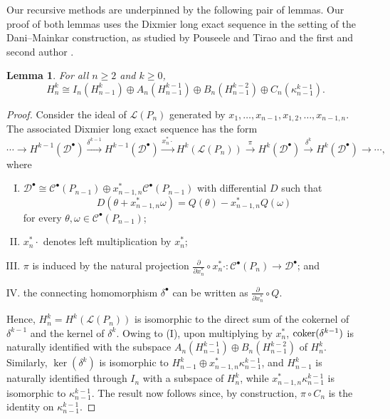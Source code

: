 \documentclass[12pt]{amsart}
\newtheorem{lem}[theorem]{Lemma}
\theoremstyle{definition}
\begin{document}
Our recursive methods are underpinned by the following pair of lemmas. Our proof of both lemmas uses the Dixmier long exact sequence in the setting of the Dani--Mainkar construction, as studied by Pouseele and Tirao \cite{PouseeleTirao09} and the first and second author \cite{AldiBevins24}.

\begin{lem}\label{lem:10} For all $n\ge 2$ and $k\ge 0$,
\begin{equation}
H_n^k\cong I_n(H^k_{n-1})\oplus A_n(H_{n-1}^{k-1})\oplus B_n(H_{n-1}^{k-2})\oplus C_n(\kappa_{n-1}^{k-1}). 
\end{equation}
\end{lem}

\begin{proof}
Consider the ideal of $\mathcal L(P_n)$ generated by 
$x_1,\ldots,x_{n-1},x_{1,2},\ldots,x_{n-1,n}$. The associated Dixmier long exact sequence has the form 
\begin{equation}\label{eq:8bis}
\cdots\rightarrow H^{k-1}(\mathcal D^\bullet)\xrightarrow{\delta^{k-1}}H^{k-1}(\mathcal D^\bullet)\xrightarrow{x_n^*\cdot}H^k(\mathcal L(P_n))\xrightarrow{\pi} H^k(\mathcal D^\bullet)\xrightarrow{\delta^k} H^{k}(\mathcal D^\bullet)\rightarrow \cdots,
\end{equation}
where
\begin{enumerate}[(I)]
\item $\mathcal D^\bullet\cong \mathcal C^\bullet(P_{n-1})\oplus x_{n-1,n}^*\mathcal C^\bullet(P_{n-1})$ with differential $D$ such that
\begin{equation}\label{eq:9bis}
D(\theta+x_{n-1,n}^*\omega)=Q(\theta)-x_{n-1,n}^*Q(\omega)
\end{equation}
for every $\theta,\omega\in \mathcal  C^\bullet(P_{n-1})$;
\item $x_{n}^*\cdot$ denotes left multiplication by $x_{n}^*$;
\item $\pi$ is induced by the natural projection $\frac{\partial}{\partial x_{n}^*}\circ x_{n}^*\cdot \colon \mathcal C^\bullet(P_n)\to \mathcal D^\bullet$; and
\item the connecting homomorphism $\delta^\bullet$ can be written as $\frac{\partial}{\partial x_{n}^*} \circ Q$.
\end{enumerate}
Hence, $H_n^k=H^k(\mathcal L(P_n))$ is isomorphic to the direct sum of the cokernel of $\delta^{k-1}$ and the kernel of $\delta^k$. Owing to (I), upon multiplying by $x_n^*$, ${\rm coker}(\delta^{k-1})$ is naturally identified with the subspace $A_n(H_{n-1}^{k-1})\oplus B_n(H_{n-1}^{k-2})$ of $H^k_n$. Similarly, $\ker(\delta^k)$ is isomorphic to $H_{n-1}^k\oplus x_{n-1,n}^*\kappa_{n-1}^{k-1}$, and $H_{n-1}^k$ is naturally identified through $I_n$ with a subspace of $H_n^k$, while $x_{n-1,n}^*\kappa_{n-1}^{k-1}$ is isomorphic to $\kappa_{n-1}^{k-1}$. The result now follows since, by construction, $\pi\circ C_n$ is the identity on $\kappa_{n-1}^{k-1}$.
\end{proof}
\end{document}
